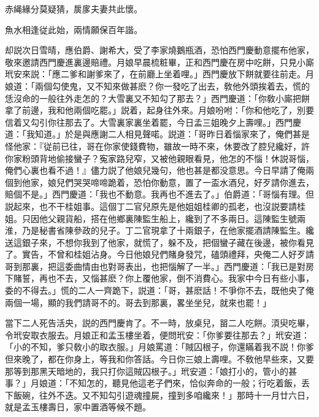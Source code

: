 赤䋲緣分莫疑猜，扊扅夫妻共此懷。

魚水相逢従此始，兩情願保百年諧。

却説次日雪晴，應伯爵、謝希大，受了李家燒鵝瓶酒，恐怕西門慶動意擺布他家，敬來邀請西門慶進裏邊賠禮。月娘早晨梳粧畢，正和西門慶在房中吃餅，只見小廝玳安來説：「應二爹和謝爹來了，在前廳上坐着哩。」西門慶放下餅就要往前走。月娘道：「兩個勾使鬼，又不知來做甚麽？你一發吃了出去，敎他外頭挨着去，慌的恁沒命的一般往外走怎的？大雪裏又不知勾了那去？」西門慶道：「你敎小廝把餅拿了前邊，我和他兩個吃罷。」説着，起身往外來。月娘吩咐：「你和他吃了，別要信着又勾引你往那去了。大雪裏家裏坐着罷，今日孟三姐晚夕上壽哩。」西門慶道：「我知道。」於是與應謝二人相見聲喏。説道：「哥昨日着惱家來了，俺們甚是怪他家：『従前已往，哥在你家使錢費物，雖故一時不來，休要改了腔兒纔好，許你家粉頭背地偷接蠻子？寃家路兒窄，又被他親眼看見，他怎的不惱！休説哥惱，俺們心裏也看不過！』儘力説了他娘兒幾句，他也甚是都没意思。今日早請了俺兩個到他家，娘兒們哭哭啼啼跪着，恐怕你動意，置了一盃水酒兒，好歹請你進去，賠個不是。」西門慶道：「我也不動意。我再也不進去了。」伯爵道：「哥惱有理。但説起來，也不干桂姐事。這個丁二官兒原先是他姐姐桂卿的孤老，也沒説要請桂姐。只因他父親貨船，搭在他鄉裏陳監生船上，纔到了不多兩日。這陳監生號兩淮，乃是秘書省陳參政的兒子。丁二官現拿了十兩銀子，在他家擺酒請陳監生。纔送這銀子來，不想你我到了他家，就慌了，躲不及，把個蠻子藏在後邊，被你看見了。實告，不曾和桂姐沾身。今日他娘兒們賭身發咒，磕頭禮拜，央俺二人好歹請哥到那裏，把這委曲情由也對哥表出，也把惱解了一半。」西門慶道：「我已是對房下賭誓，再也不去，又惱甚麽？你上覆他家，倒不消費心。我家中今日有些小事，委的不得去。」慌的二人一齊跪下，説道：「哥，甚麽話！不爭你不去，既他央了俺兩個一場，顯的我們請哥不的。哥去到那裏，畧坐坐兒，就來也罷！」

當下二人死告活央，説的西門慶肯了。不一時，放桌兒，㽞二人吃餅。湏臾吃畢，令玳安取衣服去。月娘正和孟玉樓坐着，便問玳安：「你爹要往那去？」玳安道：「小的不知，爹只敎小的取衣服。」月娘罵道：「賊囚根子，你還瞞着我不説！你爹但來晚了，都在你身上，等我和你答話。今日你三娘上壽哩。不敎他早些來，又要那等到那黑天暗地的，我只打你這賊囚根子。」玳安道：「娘打小的，管小的甚事？」月娘道：「不知怎的，聽見他這老子們來，恰似奔命的一般；行吃着飯，丢下飯碗，往外不迭。又不知勾引遊魂撞屍，撞到多咱纔來！」那時十一月廿六日，就是孟玉樓壽日，家中置酒等候不題。

